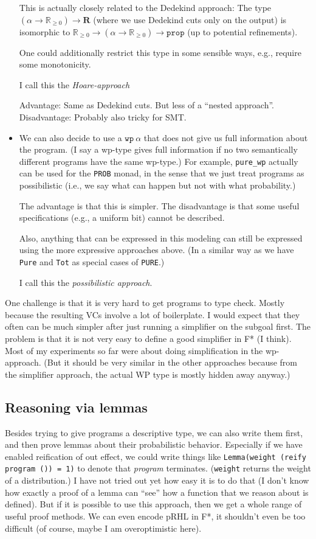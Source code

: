 \documentclass[a4paper]{article}
\newcommand\setR{\mathbb R}
\newcommand\Rpos{\setR_{\geq0}}
\newcommand\prop{\mathtt{prop}}
\begin{document}
\begin{itemize}
  This is actually closely related to the Dedekind approach: The type
  $(\alpha\to\Rpos)\to \mathbf{R}$ (where we use Dedekind cuts only on
  the output) is isomorphic to $\Rpos\to(\alpha\to\Rpos)\to\prop$ (up
  to potential refinements).

  One could additionally restrict this type in some sensible ways,
  e.g., require some monotonicity.

  I call this the \emph{Hoare-approach}
  
  Advantage: Same as Dedekind cuts. But less of a ``nested approach''.
  Disadvantage: Probably also tricky for SMT.
\item We can also decide to use a $\mathtt{wp}\ \alpha$ that does not
  give us full information about the program. (I say a wp-type gives
  full information if no two semantically different programs have the
  same wp-type.) For example, \texttt{pure\_wp} actually can be used
  for the \texttt{PROB} monad, in the sense that we just treat
  programs as possibilistic (i.e., we say what can happen but not with
  what probability.)

  The advantage is that this is simpler. The disadvantage is that some
  useful specifications (e.g., a uniform bit) cannot be described.

  Also, anything that can be expressed in this modeling can still be
  expressed using the more expressive approaches above. (In a similar
  way as we have \texttt{Pure} and \texttt{Tot} as special cases of
  \texttt{PURE}.)

  I call this the \emph{possibilistic approach}.
\end{itemize}

One challenge is that it is very hard to get programs to type
check. Mostly because the resulting VCs involve a lot of
boilerplate. I would expect that they often can be much simpler after
just running a simplifier on the subgoal first. The problem is that it
is not very easy to define a good simplifier in F* (I think). Most of
my experiments so far were about doing simplification in the
wp-approach. (But it should be very similar in the other approaches
because from the simplifier approach, the actual WP type is mostly
hidden away anyway.)

\subsection{Reasoning via lemmas}

Besides trying to give programs a descriptive type, we can also write
them first, and then prove lemmas about their probabilistic
behavior. Especially if we have enabled reification of out effect, we
could write things like \texttt{Lemma(weight (reify program ()) = 1)}
to denote that \emph{program} terminates. (\texttt{weight} returns the
weight of a distribution.) I have not tried out yet how easy it is to
do that (I don't know how exactly a proof of a lemma can ``see'' how a
function that we reason about is defined). But if it is possible to
use this approach, then we get a whole range of useful proof
methods. We can even encode pRHL in F*, it shouldn't even be too
difficult (of course, maybe I am overoptimistic here).
\end{document}
